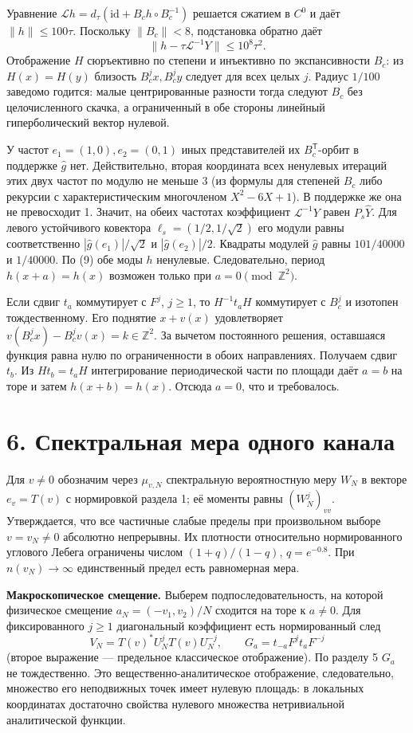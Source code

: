 \documentclass[11pt,a4paper]{article}
\newcommand{\Z}{\mathbb Z}
\newcommand{\sect}[1]{\section*{\sffamily\color{ink}#1}}
\newcommand{\subt}[1]{\par\medskip\noindent\textbf{#1.}\quad}
\begin{document}
Уравнение $\mathcal L h=d_\tau(\mathrm{id}+B_c h\circ B_c^{-1})$ решается сжатием в $C^0$ и даёт $\|h\|\le100\tau$. Поскольку $\|B_c\|<8$, подстановка обратно даёт
\[
 \|h-\tau\mathcal L^{-1}Y\|\le10^8\tau^2.                               \tag{9}
\]
Отображение $H$ сюръективно по степени и инъективно по экспансивности $B_c$: из $H(x)=H(y)$ близость $B_c^j x,B_c^j y$ следует для всех целых $j$. Радиус $1/100$ заведомо годится: малые центрированные разности тогда следуют $B_c$ без целочисленного скачка, а ограниченный в обе стороны линейный гиперболический вектор нулевой.

У частот $e_1=(1,0),e_2=(0,1)$ иных представителей их $B_c^{\mathsf T}$-орбит в поддержке $\widehat g$ нет. Действительно, вторая координата всех ненулевых итераций этих двух частот по модулю не меньше 3 (из формулы для степеней $B_c$ либо рекурсии с характеристическим многочленом $X^2-6X+1$). В поддержке же она не превосходит 1. Значит, на обеих частотах коэффициент $\mathcal L^{-1}Y$ равен $P_s\widehat Y$. Для левого устойчивого ковектора $\ell_s=(1/2,1/\sqrt2)$ его модули равны соответственно $|\widehat g(e_1)|/\sqrt2$ и $|\widehat g(e_2)|/2$. Квадраты модулей $\widehat g$ равны $101/40000$ и $1/40000$. По (9) обе моды $h$ ненулевые. Следовательно, период $h(x+a)=h(x)$ возможен только при $a=0\pmod{\Z^2}$.

Если сдвиг $t_a$ коммутирует с $F^j$, $j\ge1$, то $H^{-1}t_aH$ коммутирует с $B_c^j$ и изотопен тождественному. Его поднятие $x+v(x)$ удовлетворяет $v(B_c^j x)-B_c^jv(x)=k\in\Z^2$. За вычетом постоянного решения, оставшаяся функция равна нулю по ограниченности в обоих направлениях. Получаем сдвиг $t_b$. Из $H t_b=t_a H$ интегрирование периодической части по площади даёт $a=b$ на торе и затем $h(x+b)=h(x)$. Отсюда $a=0$, что и требовалось.
\newpage
\sect{6. Спектральная мера одного канала}
Для $v\ne0$ обозначим через $\mu_{v,N}$ спектральную вероятностную меру $W_N$ в векторе $e_v=T(v)$ с нормировкой раздела 1; её моменты равны $(W_N^j)_{vv}$. Утверждается, что все частичные слабые пределы при произвольном выборе $v=v_N\ne0$ абсолютно непрерывны. Их плотности относительно нормированного углового Лебега ограничены числом $(1+q)/(1-q)$, $q=e^{-0.8}$. При $n(v_N)\to\infty$ единственный предел есть равномерная мера.

\subt{Макроскопическое смещение} Выберем подпоследовательность, на которой физическое смещение $a_N=(-v_1,v_2)/N$ сходится на торе к $a\ne0$. Для фиксированного $j\ge1$ диагональный коэффициент есть нормированный след
\[
 V_N=T(v)^* U_N^j T(v) U_N^{-j},\qquad
 G_a=t_{-a}F^j t_a F^{-j}
\]
(второе выражение --- предельное классическое отображение). По разделу 5 $G_a$ не тождественно. Это вещественно-аналитическое отображение, следовательно, множество его неподвижных точек имеет нулевую площадь: в локальных координатах достаточно свойства нулевого множества нетривиальной аналитической функции.
\end{document}

